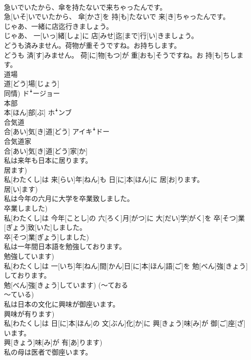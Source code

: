 \documentclass[8pt]{extreport}
\begin{document}
\begin{CJK}{UTF8}{min}
\\	急いでいたから、傘を持たないで来ちゃったんです。	
\\	急[いそ]いでいたから、 傘[かさ]を 持[も]たないで 来[き]ちゃったんです。
\\	じゃあ、一緒に店迄行きましょう。	
\\	じゃあ、 一[いっ]緒[しょ]に 店[みせ]迄[まで]行[い]きましょう。
\\	どうも済みません。荷物が重そうですね。お持ちします。	
\\	どうも 済[す]みません。 荷[に]物[もつ]が 重[おも]そうですね。お 持[も]ちします。
\\	道場	
\\	道[どう]場[じょう] 
\\	同情)	ドꜜージョー
\\	本部	
\\	本[ほん]部[ぶ]	ホꜜンブ
\\	合気道	
\\	合[あい]気[き]道[どう]	アイキꜜドー
\\	合気道家	
\\	合[あい]気[き]道[どう]家[か]	
\\	私は来年も日本に居ります。 
\\	居ます)	
\\	私[わたくし]は 来[らい]年[ねん]も 日[に]本[ほん]に 居[お]ります。 
\\	居[い]ます)
\\	私は今年の六月に大学を卒業致しました。 
\\	卒業しました)	
\\	私[わたくし]は 今年[ことし]の 六[ろく]月[がつ]に 大[だい]学[がく]を 卒[そつ]業[ぎょう]致[いた]しました。 
\\	卒[そつ]業[ぎょう]しました)
\\	私は一年間日本語を勉強しております。 
\\	勉強しています)	
\\	私[わたくし]は 一[いち]年[ねん]間[かん]日[に]本[ほん]語[ご]を 勉[べん]強[きょう]しております。 
\\	勉[べん]強[きょう]しています) (〜ておる 
\\	〜ている)
\\	私は日本の文化に興味が御座います。 
\\	興味が有ります)	
\\	私[わたくし]は 日[に]本[ほん]の 文[ぶん]化[か]に 興[きょう]味[み]が 御[ご]座[ざ]います。 
\\	興[きょう]味[み]が 有[あ]ります)
\\	私の母は医者で御座います。 

\end{CJK}
\end{document}
